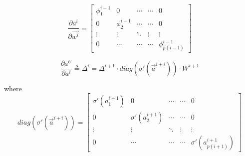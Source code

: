 \begin{equation}
\frac{\partial a^i}{\partial \vec{w^i}} =
 \begin{bmatrix}
   \phi_1^{i-1}    & 0                & \cdots      & \cdots       & 0  \\
   0               & \phi_2^{i-1}     & \cdots      & \cdots       & 0  \\
   \vdots          & \vdots           & \ddots      & \vdots       &\vdots\\
   0               & \cdots           & \cdots      & \cdots       & \phi^{i-1}_{p(i-1)}
\end{bmatrix}
\end{equation}

\begin{equation}
\frac{\partial a^U}{\partial a^i} \triangleq \Delta^i = \Delta^{i+1} \cdot diag(\sigma'(\vec{a}^{i+i})) \cdot W^{i+1}
\end{equation}

where
\begin{equation}
diag(\sigma'(\vec{a}^{i+i})) =
 \begin{bmatrix}
   \sigma'(a^{i+1}_1)    & 0                & \cdots      & \cdots       & 0  \\
   0                     & \sigma'(a^{i+1}_2)     & \cdots      & \cdots       & 0  \\
   \vdots                & \vdots           & \ddots      & \vdots       &\vdots\\
   0                     & \cdots           & \cdots      & \cdots       &\sigma'(a^{i+1}_{p(i+1)})
\end{bmatrix}
\end{equation}





